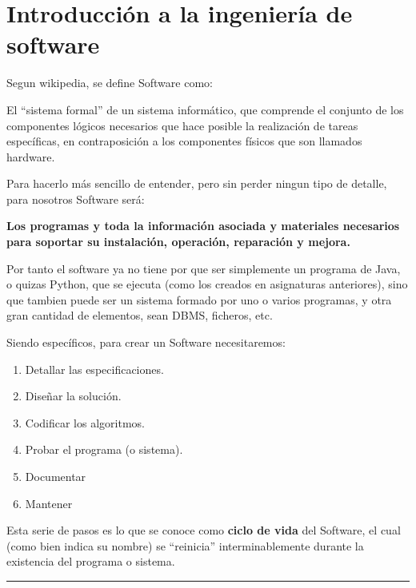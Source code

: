 \section{Introducción a la ingeniería de software}

Segun wikipedia, se define Software como:

\begin{enfasis}
    El ``sistema formal'' de un sistema informático, que comprende el conjunto de los componentes lógicos necesarios
    que hace posible la realización de tareas específicas, en contraposición a los componentes físicos que son 
    llamados hardware.
\end{enfasis}

Para hacerlo más sencillo de entender, pero sin perder ningun tipo de detalle, para nosotros Software será:

\begin{center}
    \textbf{Los programas y toda la información asociada y materiales necesarios para soportar su instalación, 
    operación, reparación y mejora.}
\end{center}

Por tanto el software ya no tiene por que ser simplemente un programa de Java, o quizas Python, que se ejecuta 
(como los creados en asignaturas anteriores), sino que tambien puede ser un sistema formado por uno o varios 
programas, y otra gran cantidad de elementos, sean DBMS, ficheros, etc.

\noindent Siendo específicos, para crear un Software necesitaremos:
\begin{enumerate}
    \item Detallar las especificaciones.
    \item Diseñar la solución.
    \item Codificar los algoritmos.
    \item Probar el programa (o sistema).
    \item Documentar
    \item Mantener
\end{enumerate}
\noindent Esta serie de pasos es lo que se conoce como \textbf{ciclo de vida} del Software, el cual (como bien 
indica su nombre) se ``reinicia'' interminablemente durante la existencia del programa o sistema.

\vspace*{2mm}

\noindent\rule{\textwidth}{0.4pt}

\vspace*{2mm}


